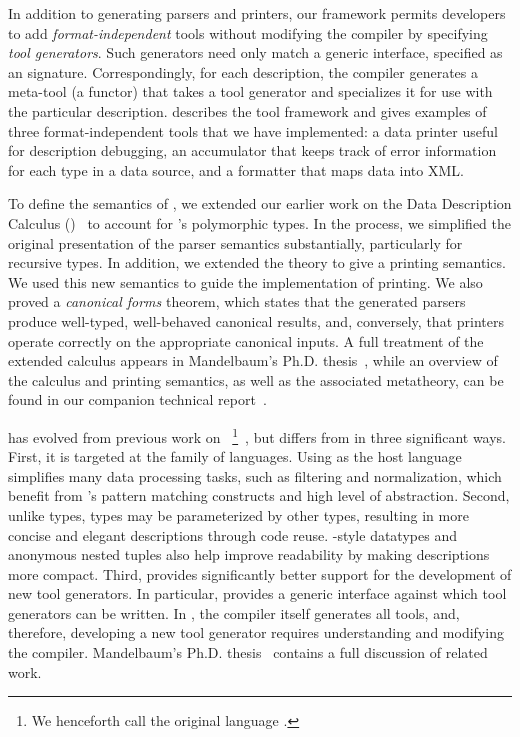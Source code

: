 \documentclass{sigplanconf}
\begin{document}
In addition to generating parsers and printers, our framework permits
developers to add {\em format-independent} tools without modifying the \padsml{} compiler by specifying \textit{tool generators}.  Such generators need only match a generic interface, specified as an \ml{} signature.  
Correspondingly, for each \padsml{} description, the \padsml{} compiler generates a meta-tool (a functor)
that takes a tool generator and specializes it for use with
the particular description.   describes the
tool framework and gives examples of three format-independent 
tools that we have
implemented: a data printer useful for description debugging,
an accumulator that keeps track of error information for
each type in a data source, and a formatter that maps data into XML.

To define the semantics of \padsml{}, we extended our earlier work on
the Data Description Calculus (\ddcold{})~\cite{fisher+:next700ddl} to
account for \padsml{}'s polymorphic types.  In the process, we
simplified the original presentation of the parser semantics
substantially, particularly for recursive types.  In addition, we
extended the theory to give a printing semantics. We used this new
semantics to guide the \padsml{} implementation of printing.  We 
also proved a {\em canonical forms} theorem, which states 
that the generated parsers produce well-typed, well-behaved canonical
results, and, conversely, that printers operate correctly on the 
appropriate canonical
inputs. A full treatment of the extended calculus appears in
Mandelbaum's Ph.D. thesis~\cite{mandelbaum-thesis}, while an overview of
the calculus and printing semantics, as well as the associated
metatheory, can be found in our companion technical
report~\cite{fisher+:popl-sub-long}.


\padsml{} has evolved from previous work on
\padsc{}~\footnote{We henceforth call the original
\pads{} language \padsc{}.}~\cite{fisher+:pads}, but
\padsml{} differs from \padsc{} in three significant ways.  First, it
is targeted at the \ml{} family of languages.  Using \ml{} as the host
language simplifies many data processing tasks, such as filtering and normalization, 
which benefit from \ml{}'s pattern matching constructs and
high level of abstraction.  Second, unlike \padsc{} types, \padsml{}
types may be parameterized by other types, resulting in more concise
and elegant descriptions through code reuse.  \ml{}-style datatypes and 
anonymous nested tuples also help improve readability by making descriptions more compact.  Third, \padsml{} provides
significantly better support for the development of new tool generators.
In particular, \padsml{} provides a generic interface against which
tool generators can be written.  In \padsc{}, the compiler itself
generates all tools, and, therefore, developing a new tool generator
requires understanding and modifying the compiler.
Mandelbaum's Ph.D. thesis~\cite{mandelbaum-thesis}
contains a full discussion of related work.
\end{document}
